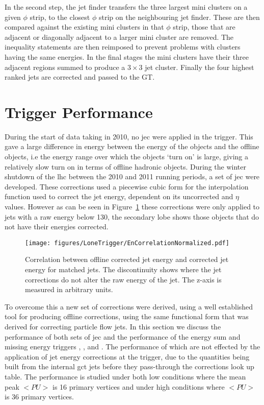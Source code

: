 In the second step, the jet finder transfers the three largest mini clusters on 
a given $\phi$ strip, to the closest $\phi$ strip on the neighbouring jet 
finder. These are then compared against the existing mini clusters in that 
$\phi$ strip, those that are adjacent or diagonally adjacent to a larger mini 
cluster are removed. The inequality statements are then reimposed to prevent 
problems with clusters having the same energies. In the final stages the mini 
clusters have their three adjacent regions summed to produce a $3 \times 3$ 
jet cluster. Finally the four highest ranked jets are corrected and passed to 
the GT.

\section{\Lone Trigger Performance} %

During the start of data taking in 2010, no \ac{jec} were 
applied in the \Lone trigger. This gave a large difference in energy between the energy of the \Lone objects and the offline objects, i.e the energy range over which the objects `turn on' is large, giving a relatively slow turn on in terms of offline hadronic objects.
During the winter shutdown of the \ac{lhc} between the 2010 and 2011 running 
periods, a set of \Lone \ac{jec} were developed. These corrections used a 
piecewise cubic form for the interpolation function used to correct the jet 
energy, dependent  on its uncorrected \ET and $\eta$ values. However as can be 
seen in Figure~\ref{fig:figures_LoneTrigger_EnCorrelationNormalized} these 
corrections were only applied to jets with a raw energy below \unit{130}{\GeV}, 
the secondary lobe shows those objects that do not have their energies 
corrected.

\begin{figure}[htbp]
  \centering
    \texttt{[image: figures/LoneTrigger/EnCorrelationNormalized.pdf]}
  \caption{Correlation between offline corrected jet energy and \Lone corrected jet energy for matched jets. The discontinuity shows where the \Lone jet corrections do not alter the raw energy of the jet. The z-axis is measured in arbitrary units.}
  \label{fig:figures_LoneTrigger_EnCorrelationNormalized}
\end{figure}

To overcome this a new set of corrections were derived, using a well established tool for producing offline corrections, 
using the same functional form that was derived for correcting particle flow 
jets\cite{PAS-JME-10-010}. In this section we discuss the performance of both sets of \Lone \ac{jec} and the performance of the energy sum and missing energy triggers \HT, \HTm, and \MET. The performance of which are not effected by the application of jet energy corrections at the \Lone trigger, due to the quantities being built from the internal \ac{gct} jets before they pass-through the corrections look up table. The performance is studied under both low \pu conditions where the mean peak \pu $<PU>$ is 16 primary vertices and under high \pu conditions where $<PU>$ is 36 primary vertices.

